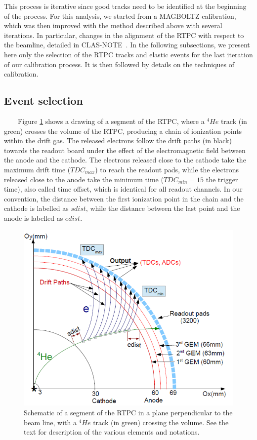 This process is iterative since good tracks need to be identified at the 
beginning of the process. For this analysis, we started from a MAGBOLTZ 
calibration, which was then improved with the method described above with 
several iterations. In particular, changes in the alignment of the RTPC with 
respect to the beamline, detailed in CLAS-NOTE~\cite{eg6beamoffset}. In the 
following subsections, we present here only the selection of the RTPC tracks 
and elastic events for the last iteration of our calibration process. It is 
then followed by details on the techniques of calibration.   

\subsection{Event selection}
~~~~Figure \ref{fig:RTPC_track} shows a drawing of a segment of the RTPC, where a $^4He$ track (in 
green) crosses the volume of the RTPC, producing a chain of ionization points 
within the drift gas. The released electrons follow the drift paths (in black) 
towards the readout board under the effect of the  electromagnetic field 
between the anode and the cathode. The electrons released close to the cathode 
take the maximum drift time ($TDC_{max}$) to reach the readout pads, while the 
electrons released close to the anode take the minimum time ($TDC_{min} = 15$ the 
trigger time), also called time offset, which is identical 
for all readout channels. In our convention, the distance between the 
first ionization point in the chain and the cathode is labelled as $sdist$, 
while the distance between the last point and the anode is labelled as 
$edist$.\\ 

\begin{figure}[tbp]
\centering
\vspace{-0.1in}
\includegraphics[scale=0.38]{fig_rtpc/RTPC_track.png}
\vspace{-0.1in}
\caption{Schematic of a segment of the RTPC in a plane perpendicular to the beam line, with a $^4He$ track (in green) crossing the volume. See the text for description of the various elements and notations.} 
\label{fig:RTPC_track}
\end{figure}

